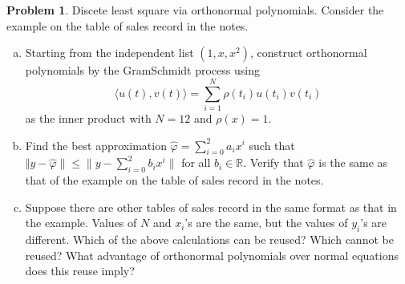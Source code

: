 \documentclass[a4paper]{book}
\numberwithin{equation}{chapter}
\theoremstyle{definition}
\newtheorem{pro}[exm]{Problem}
\begin{document}
\begin{pro}
  Discete least square via orthonormal polynomials. Consider the example on the table of sales record in the notes.

  \begin{enumerate}[(a)]
  \item Starting from the independent list $(1,x,x^2)$, construct orthonormal polynomials by the GramSchmidt process using
    \[\langle u(t), v(t) \rangle = \sum_{i =1}^N \rho(t_i) u(t_i) v(t_i) \]
    as the inner product with $N = 12$ and $\rho(x) = 1$.

  \item Find the best approximation $\hat{\varphi} = \sum_{i = 0}^2 a_i x^i$ such that $\Vert y - \hat{\varphi} \rVert \leq \lVert y - \sum_{i = 0}^2 b_i x^i \rVert$ for all $b_i \in \mathbb{R}$. Verify that $\hat{\varphi}$ is the same as that of the example on the table of sales record in the notes.

    \item Suppose there are other tables of sales record in the same format as that in the example. Values of $N$ and $x_i$'s are the same, but the values of $y_i$'s are different. Which of the above calculations can be reused? Which cannot be reused? What advantage of orthonormal polynomials over normal equations does this reuse imply?
  \end{enumerate}
\end{pro}
\end{document}
